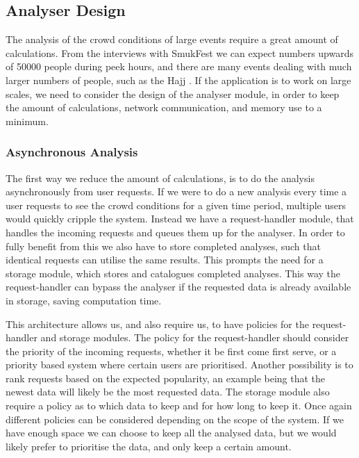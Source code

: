 \subsection{Analyser Design}\label{s3:analyser_design}

The analysis of the crowd conditions of large events require a great amount of calculations. From the interviews with SmukFest we can expect numbers upwards of 50000 people during peek hours, and there are many events dealing with much larger numbers of people, such as the Hajj \cite{website:Wikipedia-Hajj2}. If the application is to work on large scales, we need to consider the design of the analyser module, in order to keep the amount of calculations, network communication, and memory use to a minimum.

\subsubsection{Asynchronous Analysis}

The first way we reduce the amount of calculations, is to do the analysis asynchronously from user requests. If we were to do a new analysis every time a user requests to see the crowd conditions for a given time period, multiple users would quickly cripple the system. {Instead we have a request-handler module, that handles the incoming requests and queues them up for the analyser.} In order to fully benefit from this we also have to store completed analyses, such that identical requests can utilise the same results. This prompts the need for a storage module, which stores and catalogues completed analyses. This way the request-handler can bypass the analyser if the requested data is already available in storage, saving computation time.

This architecture allows us, and also require us, to have policies for the request-handler and storage modules. The policy for the request-handler should consider the priority of the incoming requests, whether it be first come first serve, or a priority based system where certain users are prioritised. Another possibility is to rank requests based on the expected popularity, an example being that the newest data will likely be the most requested data. The storage module also require a policy as to which data to keep and for how long to keep it. Once again different policies can be considered depending on the scope of the system. If we have enough space we can choose to keep all the analysed data, but we would likely prefer to prioritise the data, and only keep a certain amount.

